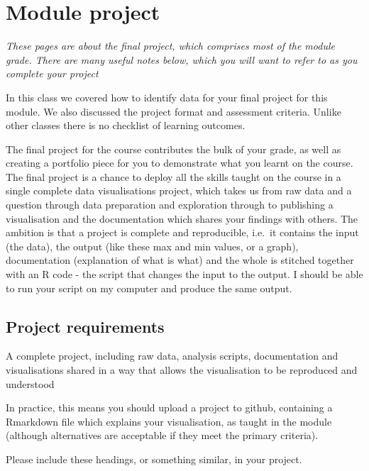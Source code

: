 \documentclass[
  12pt,
  a5paper,
]{book}
\begin{document}
\hypertarget{module-project}{%
\chapter*{Module project}\label{module-project}}


\emph{These pages are about the final project, which comprises most of the module grade. There are many useful notes below, which you will want to refer to as you complete your project}

In this class we covered how to identify data for your final project for this module. We also discussed the project format and assessment criteria. Unlike other classes there is no checklist of learning outcomes.

The final project for the course contributes the bulk of your grade, as well as creating a portfolio piece for you to demonstrate what you learnt on the course. The final project is a chance to deploy all the skills taught on the course in a single complete data visualisations project, which takes us from raw data and a question through data preparation and exploration through to publishing a visualisation and the documentation which shares your findings with others. The ambition is that a project is complete and reproducible, i.e.~it contains the input (the data), the output (like these max and min values, or a graph), documentation (explanation of what is what) and the whole is stitched together with an R code - the script that changes the input to the output. I should be able to run your script on my computer and produce the same output.

\hypertarget{requirements}{%
\section{Project requirements}\label{requirements}}

A complete project, including raw data, analysis scripts, documentation and visualisations shared in a way that allows the visualisation to be reproduced and understood

In practice, this means you should upload a project to github, containing a Rmarkdown file which explains your visualisation, as taught in the module (although alternatives are acceptable if they meet the primary criteria).

Please include these headings, or something similar, in your project.
\end{document}
